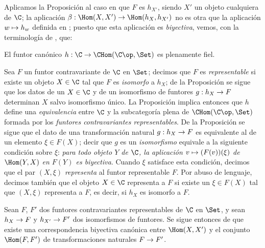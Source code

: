 \documentclass[oneside]{amsart}
\makeatletter
\newcommand{\ega@arrow}[2]{\mathchoice{#1}{#2}{#2}{#2}}
\let\ega@shortmapsto\mapsto
\renewcommand{\to}{\ega@arrow{\longrightarrow}{\rightarrow}}
\renewcommand{\mapsto}{\ega@arrow{\longmapsto}{\ega@shortmapsto}}
\let\EGAOriginalLabel\label
\renewcommand{\label}[1]{\phantomsection\EGAOriginalLabel{#1}}
\makeatother
\begin{document}
\begin{env}[8.1.6]
\label{0.8.1.6}
Aplicamos la Proposición  al caso en que $F$ es $h_{X'}$, siendo $X'$ un
objeto cualquiera de $\C$; la aplicación $\beta:\Hom(X,X')\to\Hom(h_X,h_{X'})$ no es otra que la aplicación
$w\mapsto h_w$ definida en ; puesto que esta aplicación es \emph{biyectiva}, vemos,
con la terminología de , que:
\end{env}

\begin{proposition}[8.1.7]
\label{0.8.1.7}
El funtor canónico $h:\C\to\CHom(\C\op,\Set)$ es plenamente fiel.
\end{proposition}

\begin{env}[8.1.8]
\label{0.8.1.8}
Sea $F$ un funtor contravariante de $\C$ en $\Set$; decimos que $F$ es \emph{representable} si
existe un objeto $X\in\C$ tal que $F$ es \emph{isomorfo} a $h_X$; de la
Proposición  se sigue que los datos de un $X\in\C$ y de un isomorfismo de funtores
$g:h_X\to F$ determinan $X$ salvo isomorfismo único. La Proposición  implica entonces
que $h$ define una \emph{equivalencia} entre $\C$ y la subcategoría plena de
$\CHom(\C\op,\Set)$ formada por los \emph{funtores contravariantes representables}. De la
Proposición  se sigue que el dato de una transformación natural $g:h_X\to F$ es
equivalente al de un elemento $\xi\in F(X)$; decir que $g$ es un \emph{isomorfismo} equivale
a la siguiente condición sobre $\xi$: \emph{para todo objeto $Y$ de $\C$, la aplicación
$v\mapsto(F(v))(\xi)$ de $\Hom(Y,X)$ en $F(Y)$ es biyectiva}. Cuando $\xi$ satisface esta condición,
decimos que el par $(X,\xi)$ \emph{representa} al funtor representable $F$. Por abuso de lenguaje,
decimos también que el objeto $X\in\C$ representa a $F$ si existe un $\xi\in F(X)$ tal que
$(X,\xi)$ representa a $F$, es decir, si $h_X$ es isomorfo a $F$.

Sean $F$, $F'$ dos funtores contravariantes representables de $\C$ en $\Set$, y sean $h_X\to F$ y
$h_{X'}\to F'$ dos isomorfismos de funtores. Se sigue entonces de  que
existe una correspondencia biyectiva canónica entre $\Hom(X,X')$ y el conjunto $\Hom(F,F')$ de
transformaciones naturales $F\to F'$.
\end{env}
\end{document}

